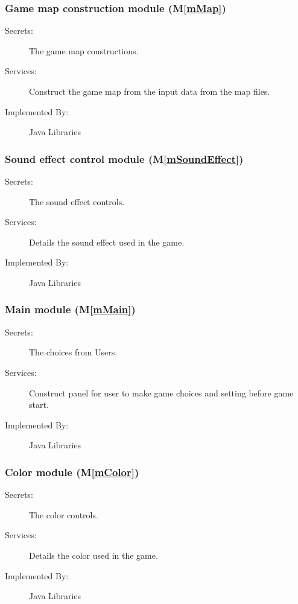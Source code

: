\documentclass[12pt, titlepage]{article}
\newcommand{\mref}[1]{M\ref{#1}}
\begin{document}
\subsubsection{Game map construction module (\mref{mMap})}

\begin{description}
\item[Secrets:]The game map constructions.
\item[Services:]Construct the game map from the input data from the map files.
\item[Implemented By:] Java Libraries
\end{description}

\subsubsection{Sound effect control module (\mref{mSoundEffect})}

\begin{description}
\item[Secrets:]The sound effect controls.
\item[Services:]Details the sound effect used in the game.
\item[Implemented By:] Java Libraries
\end{description}

\subsubsection{Main module (\mref{mMain})}

\begin{description}
\item[Secrets:]The choices from Users.
\item[Services:]Construct panel for user to make game choices and setting before game start.
\item[Implemented By:] Java Libraries
\end{description}

\subsubsection{Color module (\mref{mColor})}

\begin{description}
\item[Secrets:]The color controls.
\item[Services:]Details the color used in the game.
\item[Implemented By:] Java Libraries
\end{description}
\end{document}
